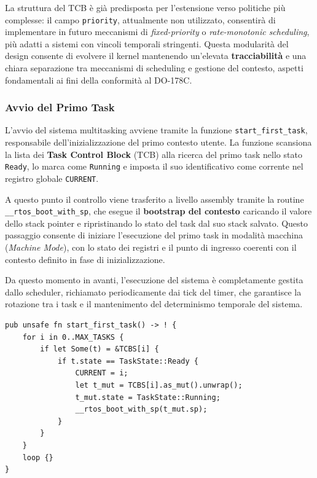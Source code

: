 \documentclass[italian, Lau, oneside]{sapthesis} %
\begin{document}
La struttura del TCB è già predisposta per l’estensione verso politiche più complesse: il campo \texttt{priority}, attualmente non utilizzato, consentirà di implementare in futuro meccanismi di \emph{fixed-priority} o \emph{rate-monotonic scheduling}, più adatti a sistemi con vincoli temporali stringenti.  
Questa modularità del design consente di evolvere il kernel mantenendo un’elevata \textbf{tracciabilità} e una chiara separazione tra meccanismi di scheduling e gestione del contesto, aspetti fondamentali ai fini della conformità al DO-178C.

\subsubsection*{Avvio del Primo Task}

L’avvio del sistema multitasking avviene tramite la funzione \texttt{start\_first\_task}, responsabile dell’inizializzazione del primo contesto utente.  
La funzione scansiona la lista dei \textbf{Task Control Block} (TCB) alla ricerca del primo task nello stato \texttt{Ready}, lo marca come \texttt{Running} e imposta il suo identificativo come corrente nel registro globale \texttt{CURRENT}.  

A questo punto il controllo viene trasferito a livello assembly tramite la routine \texttt{\_\_rtos\_boot\_with\_sp}, che esegue il \textbf{bootstrap del contesto} caricando il valore dello stack pointer e ripristinando lo stato del task dal suo stack salvato.  
Questo passaggio consente di iniziare l’esecuzione del primo task in modalità macchina (\emph{Machine Mode}), con lo stato dei registri e il punto di ingresso coerenti con il contesto definito in fase di inizializzazione.

Da questo momento in avanti, l’esecuzione del sistema è completamente gestita dallo scheduler, richiamato periodicamente dai tick del timer, che garantisce la rotazione tra i task e il mantenimento del determinismo temporale del sistema.

\begin{center}
\begin{verbatim}
pub unsafe fn start_first_task() -> ! {
    for i in 0..MAX_TASKS {
        if let Some(t) = &TCBS[i] {
            if t.state == TaskState::Ready {
                CURRENT = i;
                let t_mut = TCBS[i].as_mut().unwrap();
                t_mut.state = TaskState::Running;
                __rtos_boot_with_sp(t_mut.sp);
            }
        }
    }
    loop {}
}
\end{verbatim}
\end{center}
\end{document}
